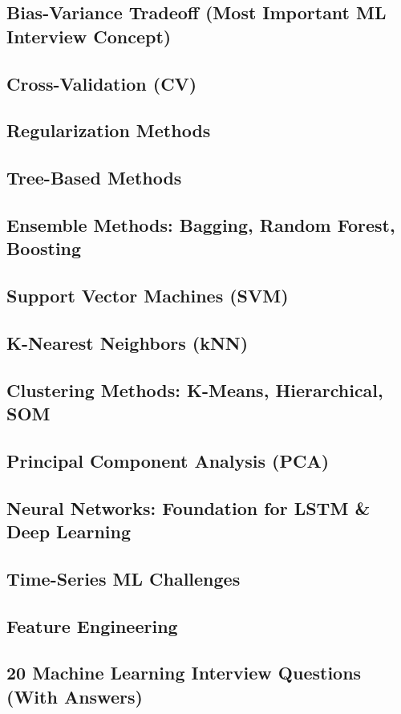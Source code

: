\documentclass{report}
\begin{document}
\subsection*{Bias-Variance Tradeoff (Most Important ML Interview Concept)}
\subsection*{Cross-Validation (CV)}
\subsection*{Regularization Methods}
\subsection*{Tree-Based Methods}
\subsection*{Ensemble Methods: Bagging, Random Forest, Boosting}
\subsection*{Support Vector Machines (SVM)}
\subsection*{K-Nearest Neighbors (kNN)}
\subsection*{Clustering Methods: K-Means, Hierarchical, SOM}
\subsection*{Principal Component Analysis (PCA)}
\subsection*{Neural Networks: Foundation for LSTM \& Deep Learning}
\subsection*{Time-Series ML Challenges}
\subsection*{Feature Engineering}
\subsection*{20 Machine Learning Interview Questions (With Answers)}
\end{document}
